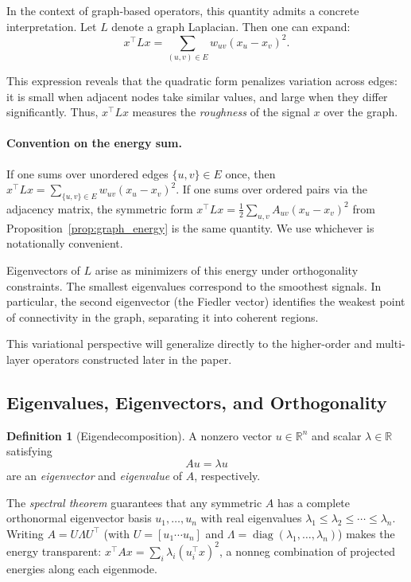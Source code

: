 \documentclass[11pt]{article}
\theoremstyle{definition}
\newtheorem{definition}[theorem]{Definition}
\theoremstyle{remark}
\newcommand{\R}{\mathbb{R}}
\DeclareMathOperator{\diag}{diag}
\begin{document}
In the context of graph-based operators, this quantity admits a concrete interpretation. Let $L$ denote a graph Laplacian. Then one can expand:
\[
x^\top L x = \sum_{(u,v) \in E} w_{uv}(x_u - x_v)^2.
\]

This expression reveals that the quadratic form penalizes variation across edges: it is small when adjacent nodes take similar values, and large when they differ significantly. Thus, $x^\top L x$ measures the \emph{roughness} of the signal $x$ over the graph.

\paragraph{Convention on the energy sum.}
If one sums over unordered edges $\{u,v\}\in E$ once, then
$x^\top Lx = \sum_{\{u,v\}\in E} w_{uv}(x_u-x_v)^2$.
If one sums over ordered pairs via the adjacency matrix, the symmetric form
$x^\top Lx = \tfrac{1}{2}\sum_{u,v}A_{uv}(x_u-x_v)^2$ from Proposition~\ref{prop:graph_energy} is the same quantity. We use whichever is notationally convenient.

Eigenvectors of $L$ arise as minimizers of this energy under orthogonality constraints. The smallest eigenvalues correspond to the smoothest signals. In particular, the second eigenvector (the Fiedler vector) identifies the weakest point of connectivity in the graph, separating it into coherent regions.

This variational perspective will generalize directly to the higher-order and multi-layer operators constructed later in the paper.

\subsection{Eigenvalues, Eigenvectors, and Orthogonality}

\begin{definition}[Eigendecomposition]
A nonzero vector $u \in \R^n$ and scalar $\lambda \in \R$ satisfying
\[
  A u = \lambda u
\]
are an \emph{eigenvector} and \emph{eigenvalue} of $A$, respectively.
\end{definition}

The \emph{spectral theorem} guarantees that any symmetric $A$ has a complete
orthonormal eigenvector basis $u_1,\dots,u_n$ with real eigenvalues
$\lambda_1 \leq \lambda_2 \leq \cdots \leq \lambda_n$. Writing
$A = U\Lambda U^\top$ (with $U = [u_1 \cdots u_n]$ and $\Lambda =
\diag(\lambda_1,\dots,\lambda_n)$) makes the energy transparent:
$x^\top A x = \sum_i \lambda_i (u_i^\top x)^2$, a nonneg combination of
projected energies along each eigenmode.
\end{document}
